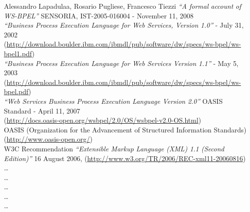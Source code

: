 \begin{thebibliography}{99}

 Alessandro Lapadulaa, Rosario Pugliese, Francesco
Tiezzi \emph{``A formal account of WS-BPEL''} SENSORIA, IST-2005-016004
- November 11, 2008
\\

 \emph{``Business Process Execution Language for Web Services,
Version 1.0''} - July 31, 2002 \\
(\href{http://download.boulder.ibm.com/ibmdl/pub/software/dw/specs/ws-bpel/ws-bpel1.pdf}{http://download.boulder.ibm.com/ibmdl/pub/software/dw/specs/ws-bpel/ws-bpel1.pdf})
\\

 \emph{``Business Process Execution Language for Web
Services Version 1.1''} - May 5, 2003 \\
(\href{http://download.boulder.ibm.com/ibmdl/pub/software/dw/specs/ws-bpel/ws-bpel.pdf}{http://download.boulder.ibm.com/ibmdl/pub/software/dw/specs/ws-bpel/ws-bpel.pdf})
\\

 \emph{``Web Services Business Process Execution Language
Version 2.0''} OASIS Standard - April 11, 2007 \\
(\href{http://docs.oasis-open.org/wsbpel/2.0/OS/wsbpel-v2.0-OS.html}{http://docs.oasis-open.org/wsbpel/2.0/OS/wsbpel-v2.0-OS.html})
\\


 OASIS (Organization for the Advancement of Structured
Information Standards)
(\href{http://www.oasis-open.org/}{http://www.oasis-open.org/})
\\

 W3C Recommendation \emph{``Extensible Markup Language (XML) 1.1
(Second Edition)''} 16 August 2006,
(\href{http://www.w3.org/TR/2006/REC-xml11-20060816}{http://www.w3.org/TR/2006/REC-xml11-20060816})
\\

 \ldots
\\

 \ldots
\\

 \ldots
\\

 \ldots
\\

 \ldots
\\


\end{thebibliography}

